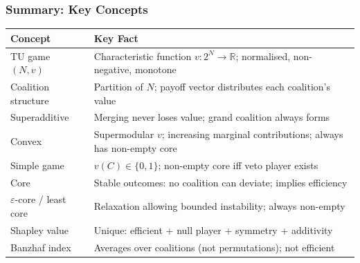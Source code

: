 \bigseparator

\subsubsection{Summary: Key Concepts}

\begin{center}
\renewcommand{\arraystretch}{1.4}
\begin{tabular}{@{} l p{9.5cm} @{}}
\toprule
\textbf{Concept} & \textbf{Key Fact} \\
\midrule
TU game $(N, v)$ & Characteristic function $v: 2^N \to \mathbb{R}$; normalised, non-negative, monotone \\
Coalition structure & Partition of $N$; payoff vector distributes each coalition's value \\
Superadditive & Merging never loses value; grand coalition always forms \\
Convex & Supermodular $v$; increasing marginal contributions; always has non-empty core \\
Simple game & $v(C) \in \{0,1\}$; non-empty core iff veto player exists \\
Core & Stable outcomes: no coalition can deviate; implies efficiency \\
$\varepsilon$-core / least core & Relaxation allowing bounded instability; always non-empty \\
Shapley value & Unique: efficient + null player + symmetry + additivity \\
Banzhaf index & Averages over coalitions (not permutations); not efficient \\
\bottomrule
\end{tabular}
\end{center}

\bigseparator
